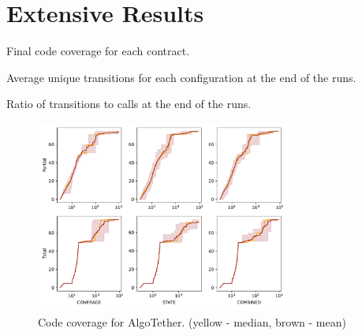 
\chapter{Extensive Results}\label{chapter:extensive-results}

\begin{table}[htbp]
    \centering
    \caption{Final code coverage for each contract.}\label{table:covs}
\end{table}

\begin{table}[htbp]
    \centering
    \caption{Average unique transitions for each configuration at the end of the runs.}\label{table:trans}
\end{table}


\begin{table}[htbp]
    \centering
    \caption{Ratio of transitions to calls at the end of the runs.}\label{table:trans-ratio}
\end{table}


\begin{figure}[htbp]
    \centering
    \includegraphics*[width=0.75\textwidth]{charts/AlgoTether_range.pdf}
    \caption{Code coverage for AlgoTether. (yellow - median, brown - mean)}
    \label{fig:AlgoTether range}
\end{figure}


